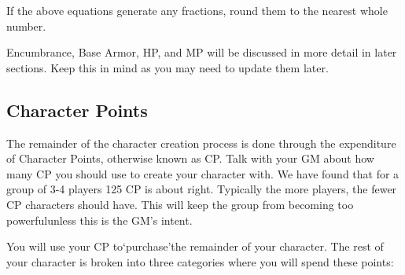\documentclass[twoside]{book}
\begin{document}
    {  
    If the above equations generate any fractions, round them to the nearest whole number.
    }
  
    {  
    Encumbrance, Base Armor, HP, and MP will be discussed in more detail in later sections. Keep this in mind as you may need to update them later.
    }
  
    

\subsection{Character Points}
    
    {  
    The remainder of the character creation process is done through the expenditure of Character Points, otherwise known as CP. Talk with your GM about how many CP you should use to create your character with. We have found that for a group of 3-4 players 125 CP is about right. Typically the more players, the fewer CP characters should have. This will keep the group from becoming too powerfulunless this is the GM's intent.
    }
  
    {  
    You will use your CP to`purchase'the remainder of your character. The rest of your character is broken into three categories where you will spend these points:
    }
  
\end{document}
